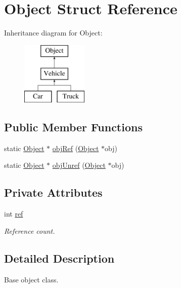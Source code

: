 \hypertarget{struct_object}{}\section{Object Struct Reference}
\label{struct_object}
Inheritance diagram for Object\+:\begin{figure}[H]
\begin{center}
\leavevmode
\includegraphics[height=3.000000cm]{struct_object}
\end{center}
\end{figure}
\subsection*{Public Member Functions}
\begin{DoxyCompactItemize}
\item 
static \mbox{\hyperlink{struct_object}{Object}} $\ast$ \mbox{\hyperlink{struct_object_a71225073d06a793b9a6ea9263ed37b12}{obj\+Ref}} (\mbox{\hyperlink{struct_object}{Object}} $\ast$obj)
\item 
static \mbox{\hyperlink{struct_object}{Object}} $\ast$ \mbox{\hyperlink{struct_object_a924ee0cecc906d148022b3f0d6325cfb}{obj\+Unref}} (\mbox{\hyperlink{struct_object}{Object}} $\ast$obj)
\end{DoxyCompactItemize}
\subsection*{Private Attributes}
\begin{DoxyCompactItemize}
\item 
int \mbox{\hyperlink{struct_object_a1b6037fba835e83243ababce426ff9af}{ref}}
\begin{DoxyCompactList}\small\item\em Reference count. \end{DoxyCompactList}\end{DoxyCompactItemize}


\subsection{Detailed Description}
Base object class. 

